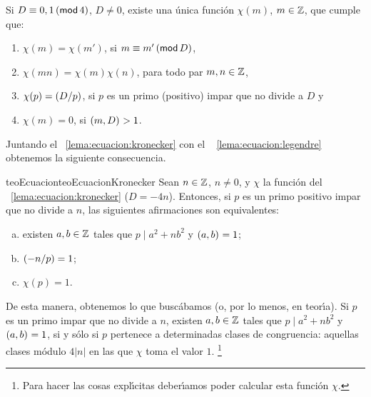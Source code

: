 \begin{lemaEcuacion}\label{lema:ecuacion:kronecker}
	Si $D\equiv 0,1\tmodulo[4]$, $D\neq 0$, existe una \'unica
	funci\'on $\chi(m)$, $m\in\Enteros$, que cumple que:
	\begin{enumerate}[(1)]
		\item\label{item:ecuacion:kronecker:clases}
			$\chi(m)=\chi(m')$, si $m\equiv m'\tmodulo[D]$,
		\item\label{item:ecuacion:kronecker:multiplicativo}
			$\chi(mn)=\chi(m)\chi(n)$, para todo par
			$m,n\in\Enteros$,
		\item\label{item:ecuacion:kronecker:legendre}
			$\chi(p)=\tlegendre D{p}$, si $p$ es un primo
			(positivo) impar que no divide a $D$ y
		\item\label{item:ecuacion:kronecker:cero}
			$\chi(m)=0$, si $\mcd{m,D}>1$.
	\end{enumerate}
\end{lemaEcuacion}

Juntando el \lemaname~\ref{lema:ecuacion:kronecker} con el \lemaname~%
\ref{lema:ecuacion:legendre} obtenemos la siguiente consecuencia.

\begin{restatable}{teoEcuacion}{teoEcuacionKronecker}
	\label{teo:ecuacion:kronecker}
	Sean $n\in\Enteros$, $n\neq 0$, y $\chi$ la funci\'on del
	\lemaname~\ref{lema:ecuacion:kronecker} ($D=-4n$). Entonces,
	si $p$ es un primo positivo impar que no divide a $n$, las siguientes
	afirmaciones son equivalentes:
	\begin{enumerate}[(a)]
		\item\label{item:ecuacion:kronecker:equivalencias:divide}
			existen $a,b\in\Enteros$ tales que
			$p\mid a^2+nb^2$ y $\mcd{a,b}=1$;
		\item\label{item:ecuacion:kronecker:equivalencias:legendre}
			$\tlegendre{-n} p=1$;
		\item\label{item:ecuacion:kronecker:equivalencias:nucleo}
			$\chi(p)=1$.
	\end{enumerate}
\end{restatable}

De esta manera, obtenemos lo que busc\'abamos (o, por lo menos, en
teor\'{\i}a). Si $p$ es un primo impar que no divide a $n$, existen
$a,b\in\Enteros$ tales que $p\mid a^2+nb^2$ y $\mcd{a,b}=1$, si y s\'olo si
$p$ pertenece a determinadas clases de congruencia: aquellas clases m\'odulo
$4|n|$ en las que $\chi$ toma el valor $1$.%
\footnote{
	Para hacer las cosas expl\'{\i}citas deber\'{\i}amos poder
	calcular esta funci\'on $\chi$.
}

